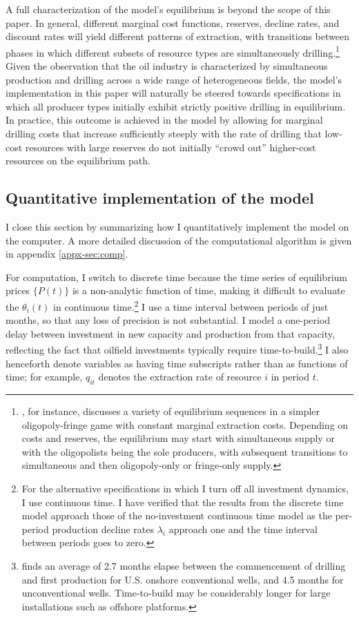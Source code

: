 \documentclass[12pt]{article}
\begin{document}
A full characterization of the model's equilibrium is beyond the scope of this paper. In general, different marginal cost functions, reserves, decline rates, and discount rates will yield different patterns of extraction, with transitions between phases in which different subsets of resource types are simultaneously drilling.\footnote{\cite{benchekrounetal2019}, for instance, discusses a variety of equilibrium sequences in a simpler oligopoly-fringe game with constant marginal extraction costs. Depending on costs and reserves, the equilibrium may start with simultaneous supply or with the oligopolists being the sole producers, with subsequent transitions to simultaneous and then oligopoly-only or fringe-only supply.} Given the observation that the oil industry is characterized by simultaneous production and drilling across a wide range of heterogeneous fields, the model's implementation in this paper will naturally be steered towards specifications in which all producer types initially exhibit strictly positive drilling in equilibrium. In practice, this outcome is achieved in the model by allowing for marginal drilling costs that increase sufficiently steeply with the rate of drilling that low-cost resources with large reserves do not initially ``crowd out'' higher-cost resources on the equilibrium path.



\subsection{Quantitative implementation of the model} \label{sec:model_comp}

I close this section by summarizing how I quantitatively implement the model on the computer. A more detailed discussion of the computational algorithm is given in appendix \ref{appx-sec:comp}.

For computation, I switch to discrete time because the time series of equilibrium prices $\{P(t)\}$ is a non-analytic function of time, making it difficult to evaluate the $\theta_i(t)$ in continuous time.\footnote{For the alternative specifications in which I turn off all investment dynamics, I use continuous time. I have verified that the results from the discrete time model approach those of the no-investment continuous time model as the per-period production decline rates $\lambda_i$ approach one and the time interval between periods goes to zero.} I use a time interval between periods of just months, so that any loss of precision is not substantial. I model a one-period delay between investment in new capacity and production from that capacity, reflecting the fact that oilfield investments typically require time-to-build.\footnote{\cite{np2019} finds an average of 2.7 months elapse between the commencement of drilling and first production for U.S. onshore conventional wells, and 4.5 months for unconventional wells. Time-to-build may be considerably longer for large installations such as offshore platforms.} I also henceforth denote variables as having time subscripts rather than as functions of time; for example, $q_{it}$ denotes the extraction rate of resource $i$ in period $t$.
\end{document}
